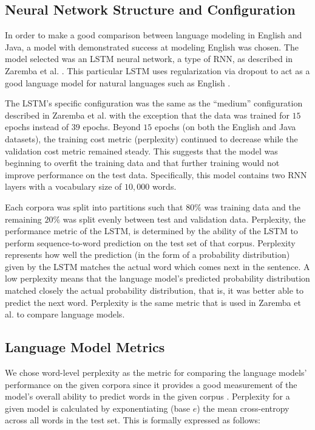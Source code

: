 \documentclass[runningheads,a4paper]{llncs}
\begin{document}
\subsection{Neural Network Structure and Configuration}

In order to make a good comparison between language modeling in English
and Java, a model with demonstrated success at modeling English was
chosen. The model selected was an LSTM neural
network, a type of RNN, as described in
Zaremba et al. \cite{Zaremba}.
This particular LSTM uses regularization via 
dropout to act as a good language model for natural languages
such as English \cite{Zaremba}.

The LSTM's specific configuration was the same as the ``medium''
configuration described in Zaremba et al. \cite{Zaremba} with the exception
that the data was trained for $15$ epochs instead of $39$ epochs.
Beyond $15$ epochs (on both the English and Java datasets), the 
training cost metric (perplexity) continued to decrease while the
validation cost metric remained steady. This suggests that the model
was beginning to overfit the training data and that further training
would not improve performance on the test data.
Specifically, this model contains two RNN layers with a vocabulary
size of $10,000$ words.

Each corpora was split into partitions such that $80\%$ was training data
and the remaining $20\%$ was split evenly between test and validation
data. Perplexity, the performance metric of the LSTM, is determined by the
ability of the LSTM to perform sequence-to-word prediction on the test
set of that corpus. Perplexity represents how well the prediction (in the
form of a probability distribution) given by the LSTM matches the actual
word which comes next in the sentence. A low perplexity means that the
language model's predicted probability distribution matched closely the
actual probability distribution, that is, it was better able to predict
the next word. Perplexity is the same metric that is used in
Zaremba et al. \cite{Zaremba} to compare language models.

\subsection{Language Model Metrics}

We chose word-level perplexity as the metric for comparing the
language models' performance on the given corpora since it provides
a good measurement of the model's overall ability to predict words
in the given corpus \cite{sundermeyer2015feedforward}. 
Perplexity for a given model is calculated
by exponentiating (base $e$) the mean
cross-entropy across all words in the test set. This is formally
expressed as follows:
\end{document}
